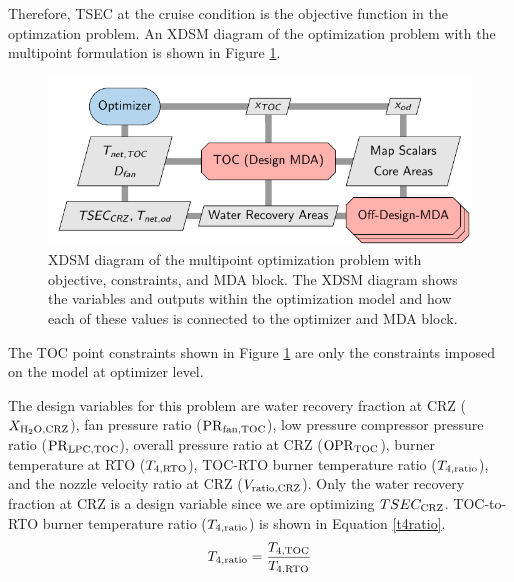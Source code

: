 \documentclass[conf]{new-aiaa}
\begin{document}
Therefore, TSEC at the cruise condition is the objective function in the optimzation problem.
An XDSM diagram of the optimization problem with the multipoint formulation is shown in Figure \ref{fig:N3_opt_xdsm}.

\begin{figure}[!hbt]
    \centering
    \includegraphics[width=1.0\textwidth]{N3_opt_XDSM.pdf}
    \caption{
        XDSM diagram of the multipoint optimization problem with objective, constraints, and MDA block.
        The XDSM diagram shows the variables and outputs within the optimization model and how each of these values is connected to the optimizer and MDA block.}
    \label{fig:N3_opt_xdsm}
\end{figure}

The TOC point constraints shown in Figure \ref{fig:N3_opt_xdsm} are only the constraints imposed on the model at optimizer level.


The design variables for this problem are water recovery fraction at CRZ ($X_{\rm{H_2O,CRZ}}$), fan pressure ratio ($\rm{PR}_{\rm{fan,TOC}}$), low pressure compressor pressure ratio ($\rm{PR}_{\rm{LPC,TOC}}$), overall pressure ratio at CRZ ($\rm{OPR}_{\rm{TOC}}$), burner temperature at RTO ($T_{4,\rm{RTO}}$), TOC-RTO burner temperature ratio ($T_{4,\rm{ratio}}$), and the nozzle velocity ratio at CRZ ($V_{\rm{ratio,CRZ}}$).
Only the water recovery fraction at CRZ is a design variable since we are optimizing $TSEC_{\rm{CRZ}}$.
TOC-to-RTO burner temperature ratio ($T_{4,\rm{ratio}}$) is shown in Equation \eqref{t4ratio}.
\begin{equation}
    T_{4,\rm{ratio}} = \frac{T_{4,\rm{TOC}}}{T_{4,\rm{RTO}}}
    \label{t4ratio}
\end{equation}
\end{document}

